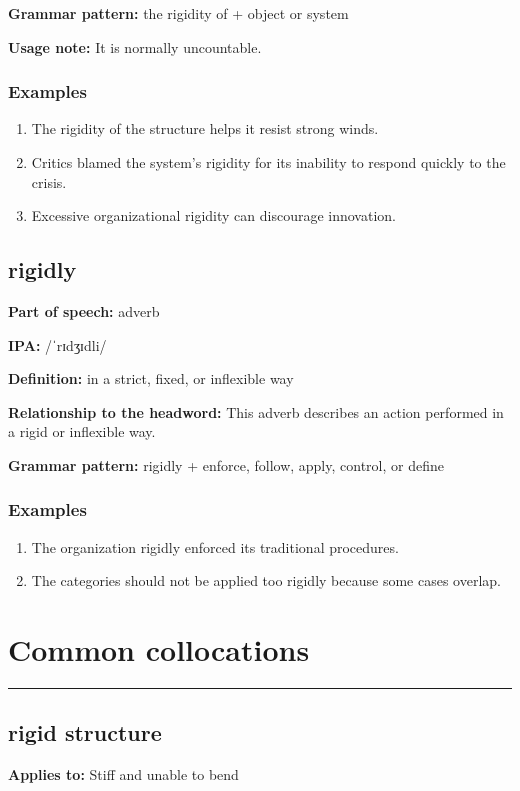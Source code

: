 \documentclass[11pt]{article}
\newcommand{\sectionrule}{\par\vspace{-0.5em}\noindent\textcolor{Accent}{\rule{\linewidth}{0.6pt}}\par}
\begin{document}
\textbf{Grammar pattern:} the rigidity of + object or system

\textbf{Usage note:} It is normally uncountable.

\subsubsection{Examples}
\begin{enumerate}
  \item The rigidity of the structure helps it resist strong winds.
  \item Critics blamed the system's rigidity for its inability to respond quickly to the crisis.
  \item Excessive organizational rigidity can discourage innovation.
\end{enumerate}

\subsection{rigidly}
\textbf{Part of speech:} adverb

\textbf{IPA:} /ˈrɪdʒɪdli/

\textbf{Definition:} in a strict, fixed, or inflexible way

\textbf{Relationship to the headword:} This adverb describes an action performed in a rigid or inflexible way.

\textbf{Grammar pattern:} rigidly + enforce, follow, apply, control, or define

\subsubsection{Examples}
\begin{enumerate}
  \item The organization rigidly enforced its traditional procedures.
  \item The categories should not be applied too rigidly because some cases overlap.
\end{enumerate}

\section{Common collocations}
\sectionrule
\subsection{rigid structure}
\textbf{Applies to:} Stiff and unable to bend
\end{document}

